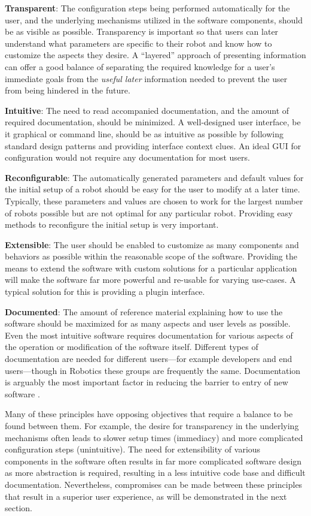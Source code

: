 \documentclass[10pt,journal,compsoc]{joser1}
\begin{document}
{{\bf Transparent}: The configuration steps being performed automatically for the user, and the underlying mechanisms utilized in the software components, should be as visible as possible. Transparency is important so that users can later understand what parameters are specific to their robot and know how to customize the aspects they desire. A ``layered'' approach of presenting information can offer a good balance of separating the required knowledge for a user's immediate goals from the \textit{useful later} information needed to prevent the user from being hindered in the future.

{\bf Intuitive}: The need to read accompanied documentation, and the amount of required documentation, should be minimized. A well-designed user interface, be it graphical or command line, should be as intuitive as possible by following standard design patterns and providing interface context clues. An ideal GUI for configuration would not require any documentation for most users.

{\bf Reconfigurable}: The automatically generated parameters and default values for the initial setup of a robot should be easy for the user to modify at a later time. Typically, these parameters and values are chosen to work for the largest number of robots possible but are not optimal for any particular robot. Providing easy methods to reconfigure the initial setup is very important.

{\bf Extensible}: The user should be enabled to customize as many components and behaviors as possible within the reasonable scope of the software. Providing the means to extend the software with custom solutions for a particular application will make the software far more powerful and re-usable for varying use-cases. A typical solution for this is providing a plugin interface.

{\bf Documented}: The amount of reference material explaining how to use the software should be maximized for as many aspects and user levels as possible. Even the most intuitive software requires documentation for various aspects of the operation or modification of the software itself. Different types of documentation are needed for different users---for example developers and end users---though in Robotics these groups are frequently the same. Documentation is arguably the most important factor in reducing the barrier to entry of new software \cite{forward2002relevance}.

Many of these principles have opposing objectives that require a balance to be found between them. For example, the desire for transparency in the underlying mechanisms often leads to slower setup times (immediacy) and more complicated configuration steps (unintuitive). The need for extensibility of various components in the software often results in far more complicated software design as more abstraction is required, resulting in a less intuitive code base and difficult documentation. Nevertheless, compromises can be made between these principles that result in a superior user experience, as will be demonstrated in the next section.

}
\end{document}
